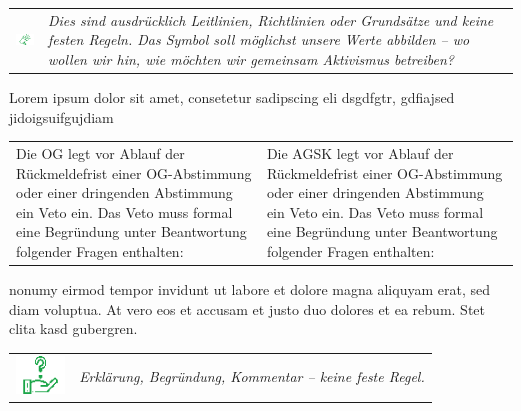 \documentclass[a4paper,
  ]{scrartcl}
\newcommand{\paralleltext}[2]{
\begin{tabularx}{\textwidth}{X X}

#1 & #2 \\
\end{tabularx}
}
\newcommand{\announcement}[1]{%
\begin{tabularx}{\textwidth}{p{1.5cm}X}
\centering\includegraphics[width=1.5cm]{Lautsprecher.png} & \textit{#1} \\
\end{tabularx}
}
\newcommand{\hint}[1]{%
\begin{tabularx}{\textwidth}{p{1.5cm}X}
\centering\includegraphics[width=1.3cm]{Fragezeichen-Hand.png} & \textit{#1} \\
\end{tabularx}
}
\begin{document}
\announcement{Dies sind ausdrücklich Leitlinien, Richtlinien oder Grundsätze und keine festen Regeln. Das Symbol soll möglichst unsere Werte abbilden – wo wollen wir hin, wie möchten wir gemeinsam Aktivismus betreiben?}
Lorem ipsum dolor sit amet, consetetur sadipscing eli dsgdfgtr, gdfiajsed jidoigsuifgujdiam

\paralleltext{
  Die OG legt vor Ablauf der Rückmeldefrist einer OG-Abstimmung oder einer dringenden Abstimmung ein Veto ein. Das Veto muss formal eine Begründung unter Beantwortung folgender Fragen enthalten:
}{
  Die AGSK legt vor Ablauf der Rückmeldefrist einer OG-Abstimmung oder einer dringenden Abstimmung ein Veto ein. Das Veto muss formal eine Begründung unter Beantwortung folgender Fragen enthalten:
}


nonumy eirmod tempor invidunt ut labore et dolore magna aliquyam erat, sed diam voluptua. At vero eos et accusam et justo duo dolores et ea rebum. Stet clita kasd gubergren.

\hint{Erklärung, Begründung, Kommentar – keine feste Regel.}
\end{document}
